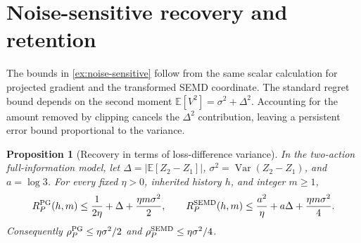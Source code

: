 \documentclass[11pt,twoside]{article}
\newcommand{\E}{\mathbb E}
\newtheorem{proposition}[theorem]{Proposition}
\theoremstyle{definition}
\theoremstyle{remark}
\begin{document}
\section{Noise-sensitive recovery and retention}
\label{app:noise-adaptation}

The bounds in \cref{ex:noise-sensitive} follow from the same scalar
calculation for projected gradient and the transformed SEMD coordinate.
The standard regret bound depends on the second moment
$\E[V^2]=\sigma^2+\Delta^2$. Accounting for the amount removed by clipping
cancels the $\Delta^2$ contribution, leaving a persistent error bound
proportional to the variance.

\begin{proposition}[Recovery in terms of loss-difference variance]
In the two-action full-information model, let
$\Delta=|\E[Z_2-Z_1]|$, $\sigma^2=\operatorname{Var}(Z_2-Z_1)$,
and $a=\log3$. For every fixed $\eta>0$, inherited history $h$, and
integer $m\ge1$,
\[
 R_P^{\rm PG}(h,m)\le\frac1{2\eta}+\Delta+\frac{\eta m\sigma^2}{2},
 \qquad
 R_P^{\rm SEMD}(h,m)\le\frac{a^2}{\eta}+a\Delta
                              +\frac{\eta m\sigma^2}{4}.
\]
Consequently $\rho_P^{\rm PG}\le\eta\sigma^2/2$ and
$\rho_P^{\rm SEMD}\le\eta\sigma^2/4$.
\end{proposition}
\end{document}
